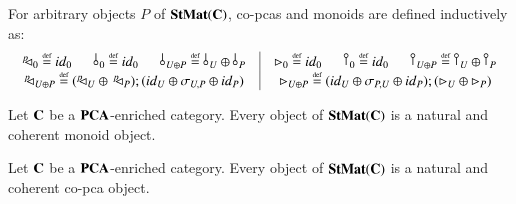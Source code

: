 For arbitrary objects $P$ of $\mathbf{StMat}(\mathbf{C})$, co-pcas and monoids are defined inductively as:
\begin{equation}\label{eq:indmoncopca}
\begin{array}{c|c}
\begin{array}{ccc}
 \diagp{\zero}\defeq \id{\zero}\; &\; \bang{\zero}\defeq \id{\zero}\; &\; \bang{U \oplus P}\defeq \bang{U}\oplus \bang{P}
 \end{array}
 &
 \begin{array}{ccc}
\codiag{\zero}\defeq \id{\zero}\; &\; \cobang{\zero}\defeq \id{\zero} \;& \;\cobang{U \oplus P}\defeq \cobang{U}\oplus \cobang{P}
\end{array} \\
\diagp{U \oplus P}\defeq (\diagp{U} \piu\, \diagp{P});(\id{U} \piu \symm{U}{P} \piu \id{P})&
\codiag{U\oplus P}\defeq (\id{U} \piu \symm{P}{U} \piu \id{P});(\codiag{U}\piu \codiag{P})
\end{array}
\end{equation}

%
%
%
%
\begin{lemma}\label{lemma:stmat coproduct}
Let $\mathbf{C}$ be a $\mathbf{PCA}$-enriched category. Every object of $\mathbf{StMat}(\mathbf{C})$ is a natural and coherent monoid object.
\end{lemma}


\begin{lemma}\label{lemma:stmat copca}
Let $\mathbf{C}$ be a $\mathbf{PCA}$-enriched category. Every object of $\mathbf{StMat}(\mathbf{C})$ is a natural and coherent co-pca object.%
\end{lemma}


